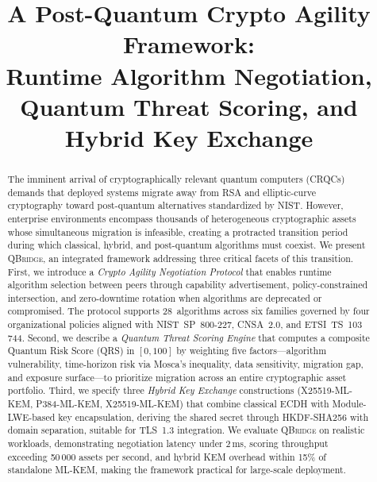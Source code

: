 \documentclass[conference,10pt]{IEEEtran}
\newcommand{\system}{\textsc{QBridge}}
\begin{document}
\title{A Post-Quantum Crypto Agility Framework:\\Runtime Algorithm Negotiation, Quantum Threat Scoring, and Hybrid Key Exchange}

\author{
}

\maketitle

\begin{abstract}
The imminent arrival of cryptographically relevant quantum computers (CRQCs)
demands that deployed systems migrate away from RSA and elliptic-curve
cryptography toward post-quantum alternatives standardized by NIST.
However, enterprise environments encompass thousands of heterogeneous
cryptographic assets whose simultaneous migration is infeasible, creating
a protracted transition period during which classical, hybrid, and
post-quantum algorithms must coexist. We present \system{}, an integrated
framework addressing three critical facets of this transition.
First, we introduce a \emph{Crypto Agility Negotiation Protocol} that
enables runtime algorithm selection between peers through capability
advertisement, policy-constrained intersection, and zero-downtime
rotation when algorithms are deprecated or compromised. The protocol
supports 28~algorithms across six families governed by four organizational
policies aligned with NIST~SP~800-227, CNSA~2.0, and ETSI~TS~103\,744.
Second, we describe a \emph{Quantum Threat Scoring Engine} that computes
a composite Quantum Risk Score (QRS) in $[0,100]$ by weighting five
factors---algorithm vulnerability, time-horizon risk via Mosca's
inequality, data sensitivity, migration gap, and exposure surface---to
prioritize migration across an entire cryptographic asset portfolio.
Third, we specify three \emph{Hybrid Key Exchange} constructions
(X25519\nobreakdash-ML\nobreakdash-KEM,
P384\nobreakdash-ML\nobreakdash-KEM,
X25519\nobreakdash-ML\nobreakdash-KEM) that combine
classical ECDH with Module-LWE-based key encapsulation, deriving the
shared secret through HKDF-SHA256 with domain separation, suitable for
TLS~1.3 integration. We evaluate \system{} on realistic workloads,
demonstrating negotiation latency under 2\,ms, scoring throughput
exceeding 50\,000 assets per second, and hybrid KEM overhead within
15\% of standalone ML-KEM, making the framework practical for
large-scale deployment.
\end{abstract}
\end{document}

